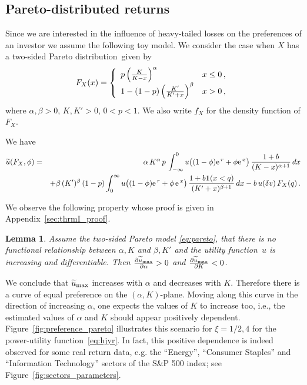 \documentclass[11pt,a4]{amsart}
\newcommand{\pd}{\partial}
\newcommand{\ex}{{\rm e}\,}
\newtheorem{lemma}{Lemma}[section]
\newcommand{\ble}{\begin{lemma}}
\newcommand{\ele}{\end{lemma}}
\newcommand{\beam}{\begin{eqnarray}}
\newcommand{\eeam}{\end{eqnarray}\noindent}
\newcommand{\wt}{\widetilde}
\newcommand{\fct}{function}
\newcommand{\ds}{distribution}
\newcommand{\1}{{\mathbf 1}}
\begin{document}
\subsection{Pareto-distributed returns}\label{sec:pareto_tail}
Since we are interested in the influence of heavy-tailed losses on the preferences of an investor 
we assume the following toy model. 
We consider the case when $X$ has a two-sided Pareto \ds\ given by
\beam\label{eq:pareto}
  F_X(x) = \left\{
  \begin{array}{ll}
    p \left(
    {K \over K - x}
    \right)^\alpha & x \leq 0 \,,\\
    1 - (1 - p) \left(
    {K' \over K' + x}
    \right)^\beta & x > 0\,,
  \end{array}
  \right.
\eeam
where
$\alpha, \beta > 0$, $K,K' > 0$, $0 < p < 1$. 
We also write $f_X$ for the density function of $F_X$.
\par
We have
\beam\label{eq:xxie1.0}
 \wt u(F_X, \phi)\nonumber
  &=&
  \alpha\, K^\alpha\,  p\,
  \int_{-\infty}^0
  u\big( (1 - \phi) \ex^r + \phi \ex^x \big)\,
  {1 + b \over (K - x)^{\alpha + 1}} \,dx\\
    &&+
  \beta \,(K')^\beta\, (1 - p)
  \int_{0}^\infty
  u\big( (1 - \phi) \ex^r + \phi\, \ex^x \big)\,
  {1 + b \1(x <  q) \over (K' + x)^{\beta + 1}} \,dx 
  - b \,u(\delta v) \,F_X(q) \,.\label{eq:pp}
\eeam
\par
We observe the following property 
whose proof is given in Appendix~\ref{sec:thrmI_proof}. 
\ble\label{thrm:I}
Assume the two-sided Pareto model \eqref{eq:pareto},
that there is no \fct al relationship between $\alpha,K$ and $\beta,K'$
and the utility \fct\ $u$ is increasing and differentiable. Then
$\frac{\pd \wt u_{\rm max}}{\pd \alpha} > 0$ and
$\frac{\pd \wt u_{\rm max}}{\pd K} < 0$.
\ele
We conclude that
$\wt u_{\rm max}$ increases with $\alpha$ and decreases with
$K$. Therefore there is a curve of  equal preference on the $(\alpha,
K)$-plane. Moving along this curve in the direction of increasing
$\alpha$, one expects the values of $K$ to increase too, i.e., the
estimated values of $\alpha$ and $K$ 
should appear positively dependent. Figure~\ref{fig:preference_pareto}
illustrates this scenario for $\xi = 1/2, 4$ for the power-utility
\fct\ \eqref{eq:hjyr}.
In fact, this positive dependence is indeed observed for some
real return data, e.g. the ``Energy'', ``Consumer Staples'' and
``Information Technology'' sectors of the S\&P 500 index; see 
Figure~\ref{fig:sectors_parameters}.
\par
\end{document}
